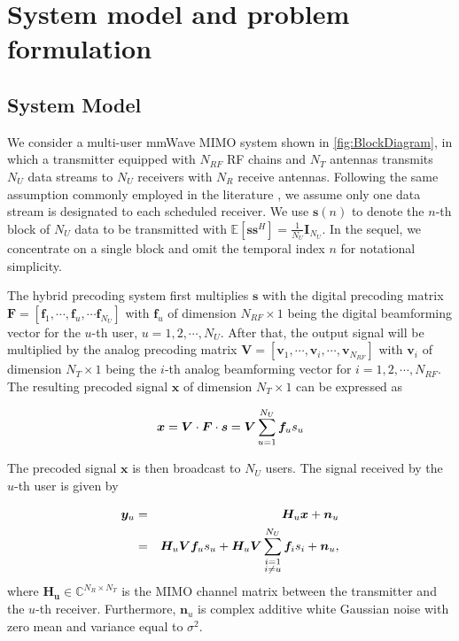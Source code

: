 \documentclass[conference]{IEEEtran}
\begin{document}
\section{System model and problem formulation}
\subsection{System Model}
We consider a multi-user mmWave MIMO system shown in \figurename{ \ref{fig:BlockDiagram}}, in which a transmitter equipped with $N_{RF}$ RF chains and $N_T$ antennas transmits $N_U$ data streams to $N_U$ receivers with $N_R$ receive antennas. Following the same assumption commonly employed in the literature \cite{alkhateeb2015limited}, we assume only one data stream is designated to each scheduled receiver. We use ${\bm s}(n)$ to denote the $n$-th block of $N_U$ data to be transmitted with $\mathbb{E}\left[\bm{ss}^H\right]=\frac{1}{N_U}\bm{I}_{N_U}$. In the sequel, we concentrate on a single block and omit the temporal index $n$ for notational simplicity. 

The hybrid precoding system first multiplies ${\bm s}$ with the digital precoding matrix $\bm{F}=\left[{\bm f}_1,\cdots,{\bm f}_u,\cdots{\bm f}_{N_U}\right]$ with ${\bm f}_u$ of dimension $N_{RF}\times 1$ being the digital beamforming vector for the $u$-th user, $u=1,2,\cdots,N_U$. After that, the output signal will be multiplied by the analog precoding matrix $\bm{V}=\left[{\bm v}_1,\cdots,{\bm v}_i,\cdots,{\bm v}_{N_{RF}}\right]$ with ${\bm v}_i$ of dimension $N_T\times 1$ being the $i$-th analog beamforming vector for $i=1,2,\cdots,N_{RF}$. The resulting precoded signal $\bm x$ of dimension $N_T\times 1$  can be expressed as

\begin{equation}{\label{eq:transx1}}
{\bm x} = \bm{V}\cdot \bm{F}\cdot\bm{s}= \bm{V}\sum_{u=1}^{N_U}\bm{f}_us_u
\end{equation}

The precoded signal $\bm x$ is then broadcast to $N_U$ users. The signal received by the $u$-th user is given by

\begin{eqnarray}{\label{eq:transx2}}
{\bm y}_u &=& \bm{H}_u \bm{x} + \bm{n}_u\\
&=&\bm{H}_u \bm{V}\bm{f}_us_u+\bm{H}_u \bm{V}\sum_{\substack{i=1 \\ i\neq u}}^{N_U}\bm{f}_is_i+\bm{n}_u,
\end{eqnarray}
where $\bm{H_u}$$\in\mathbb{C}^{N_R\times N_T}$ is the MIMO channel matrix between the transmitter and the $u$-th receiver\cite{el2014spatially}. Furthermore, $\bm{n}_u$ is complex additive white Gaussian noise with zero mean and variance equal to $\sigma^2$.
\end{document}
